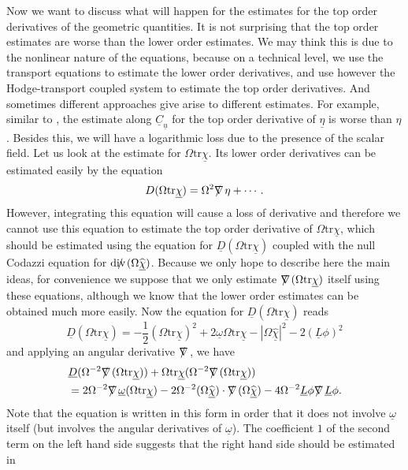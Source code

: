 \documentclass[11pt,reqno]{amsart}
\theoremstyle{definition}
\numberwithin{equation}{section}
\newcommand{\tr}{\mathrm{tr}}
\def\chib{\underline{\chi}}
\def\chibh{\widehat{\underline{\chi}}}
\def\etab{\underline{\eta}}
\def\Lb{\underline{L}}
\def\tr{\mathrm{tr}}
\def\omegab{\underline{\omega}}
\def\ub{\underline{u}}
\def\Cb{\underline{C}}
\newcommand{\Db}{\underline{D}}
\def\nablas{\mbox{$\nabla \mkern -13mu /$ }}
\def\divs{\mbox{$\mathrm{div} \mkern -13mu /$ }}
\begin{document}
Now we want to discuss what will happen for the estimates for the top order derivatives of the geometric quantities. It is not surprising that the top order estimates are worse than the lower order estimates. We may think this is due to the nonlinear nature of the equations, because on a technical level, we use the transport equations to estimate the lower order derivatives, and use however the Hodge-transport coupled system to estimate the top order derivatives. And sometimes different approaches give arise to different estimates. For example, similar to \cite{An-Luk}, the estimate along $\Cb_{\ub}$ for the top order derivative of $\etab$ is worse than $\eta$. Besides this, we will have a logarithmic loss due to the presence of the scalar field. Let us look at the estimate for $\Omega\tr\chib$. Its lower order derivatives can be estimated easily by the equation
\begin{align*}
D(\Omega\tr\chib)=\Omega^2\nablas\eta+\cdots.
\end{align*}
However, integrating this equation will cause a loss of derivative and therefore we cannot use this equation to estimate the top order derivative of $\Omega\tr\chib$, which should be estimated using the equation for $\Db(\Omega\tr\chib)$ coupled with the null Codazzi equation for $\divs(\Omega\chibh)$. Because we only hope to describe here the main ideas, for convenience we suppose that we only estimate $\nablas(\Omega\tr\chib)$ itself using these equations, although we know that the lower order estimates can be obtained much more easily. Now the equation for $\Db(\Omega\tr\chib)$ reads
\begin{equation*}
\Db(\Omega\tr\chib)=-\frac{1}{2}(\Omega\tr\chib)^2+2\omegab\Omega\tr\chib-|\Omega\chibh|^2-2(\Lb\phi)^2
\end{equation*}
and applying an angular derivative $\nablas$, we have
\begin{equation}\label{equ-Dbtrchib-intro}
\begin{split}
&\Db(\Omega^{-2}\nablas(\Omega\tr\chib))+\Omega\tr\chib(\Omega^{-2}\nablas(\Omega\tr\chib))\\
&=2\Omega^{-2}\nablas\omegab(\Omega\tr\chib)-2\Omega^{-2}(\Omega\chibh)\cdot\nablas(\Omega\chibh)
-4\Omega^{-2}\Lb\phi\nablas\Lb\phi.\\
\end{split}
\end{equation}
Note that the equation is written in this form in order that it does not involve $\omegab$ itself (but involves the angular derivatives of $\omegab$). The coefficient $1$ of the second term on the left hand side suggests that the right hand side should be estimated in
\end{document}
